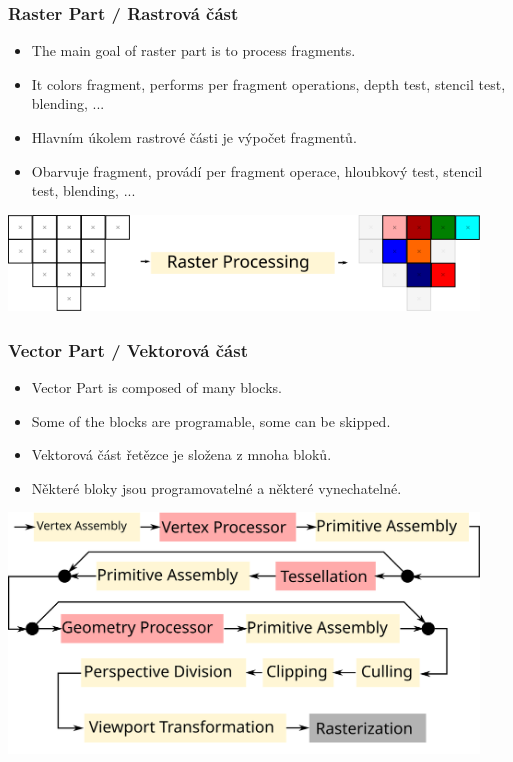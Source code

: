 \begin{frame}
\frametitle{Raster Part / Rastrová část}
  \scriptsize
	\begin{itemize}
		\item The main goal of raster part is to process fragments.
    \item It colors fragment, performs per fragment operations, depth test, stencil test, blending, ...
	\end{itemize}

	\begin{itemize}
		\item Hlavním úkolem rastrové části je výpočet fragmentů.
    \item Obarvuje fragment, provádí per fragment operace, hloubkový test, stencil test, blending, ...
	\end{itemize}
  \includegraphics[width=12.5cm,keepaspectratio]{pics/pipeline/pfo_overview}
\end{frame}


\begin{frame}
\frametitle{Vector Part / Vektorová část}
  \scriptsize
	\begin{itemize}
		\item Vector Part is composed of many blocks.
    \item Some of the blocks are programable, some can be skipped.
	\end{itemize}
	\begin{itemize}
		\item Vektorová část řetězce je složena z mnoha bloků.
    \item Některé bloky jsou programovatelné a některé vynechatelné.
	\end{itemize}
	\includegraphics[width=12.5cm,keepaspectratio]{pics/pipeline/RenderingPipelineVector}
\end{frame}

